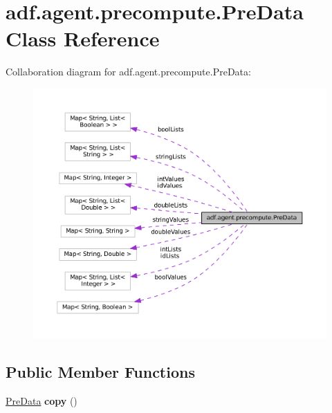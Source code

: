 \hypertarget{classadf_1_1agent_1_1precompute_1_1PreData}{}\section{adf.\+agent.\+precompute.\+Pre\+Data Class Reference}
\label{classadf_1_1agent_1_1precompute_1_1PreData}


Collaboration diagram for adf.\+agent.\+precompute.\+Pre\+Data\+:
\nopagebreak
\begin{figure}[H]
\begin{center}
\leavevmode
\includegraphics[width=350pt]{classadf_1_1agent_1_1precompute_1_1PreData__coll__graph}
\end{center}
\end{figure}
\subsection*{Public Member Functions}
\begin{DoxyCompactItemize}
\item 
\hypertarget{classadf_1_1agent_1_1precompute_1_1PreData_ad6007344b7431ea23177008e654c0f57}{}\label{classadf_1_1agent_1_1precompute_1_1PreData_ad6007344b7431ea23177008e654c0f57} 
\hyperlink{classadf_1_1agent_1_1precompute_1_1PreData}{Pre\+Data} {\bfseries copy} ()
\end{DoxyCompactItemize}
